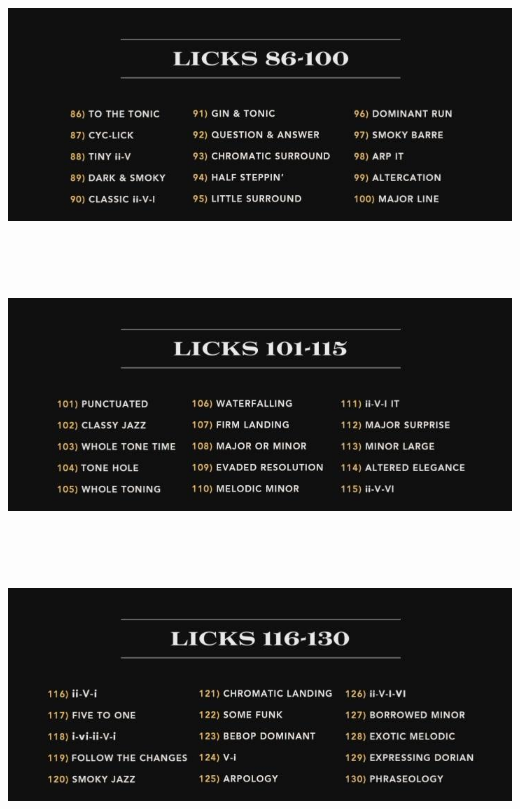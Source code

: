 \documentclass[a4paper]{book}
\begin{document}
\clearpage

\begin{center}
\includegraphics[width=17cm,height=7.177cm]{lebluessupportsmethodes-img37.jpg}
\end{center}


\begin{center}
\includegraphics[width=17cm,height=7.177cm]{lebluessupportsmethodes-img38.jpg}
\end{center}


\begin{center}
\includegraphics[width=17cm,height=7.177cm]{lebluessupportsmethodes-img39.jpg}
\end{center}
\end{document}

